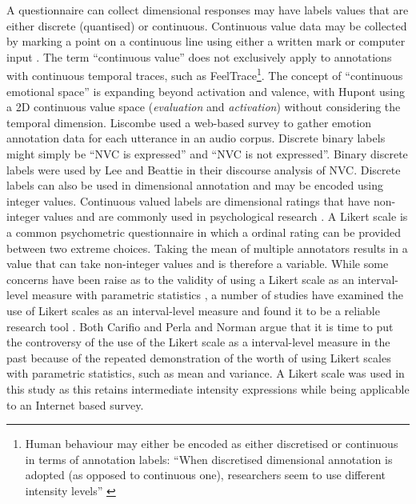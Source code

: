 A questionnaire can collect dimensional responses may have labels values that are either discrete (quantised) or continuous. Continuous value data may be collected by marking a point on a continuous line using either a written mark or computer input \cite{Treiblmaier2011}. The term ``continuous value'' does not exclusively apply to annotations with continuous temporal traces, such as FeelTrace\footnote{Human behaviour may either be encoded as either discretised or continuous in terms of annotation labels: ``When discretised dimensional annotation is adopted (as opposed to continuous one), researchers seem to use different intensity levels'' \cite{Gunes2011}}. The concept of ``continuous emotional space'' is expanding beyond activation and valence, with Hupont \etal \cite{Hupont2013} using a 2{D} continuous value space (\textit{evaluation} and \textit{activation}) without considering the temporal dimension. Liscombe \etal \cite{Liscombe2003} used a web-based survey to gather \continuous emotion annotation data for each utterance in an audio corpus. Discrete binary labels might simply be ``\ac{NVC} is expressed'' and ``\ac{NVC} is not expressed''. Binary discrete labels were used by Lee and Beattie \cite{Lee1998} in their discourse analysis of \ac{NVC}. Discrete labels can also be used in dimensional annotation and may be encoded using integer values. Continuous valued labels are dimensional ratings that have non-integer values and are commonly used in psychological research \cite{Nicolaou2011, Wollmer2009, Cowie2000}. A Likert scale \cite{Likert1932} is a common psychometric questionnaire in which a ordinal rating can be provided between two extreme choices. Taking the mean of multiple annotators results in a value that can take non-integer values and is therefore a \continuous variable. While some concerns have been raise as to the validity of using a Likert scale as an interval-level measure with parametric statistics \cite{Jamieson2004}, a number of studies have examined the use of Likert scales as an interval-level measure and found it to be a reliable research tool \cite{Rasmussen1989} \cite{Owuor2001}. Both Carifio and Perla \cite{Carifio2007} and Norman \cite{Norman2010} argue that it is time to put the controversy of the use of the Likert scale as a interval-level measure in the past because of the repeated demonstration of the worth of using Likert scales with parametric statistics, such as mean and variance.
A Likert scale was used in this study as this retains intermediate intensity expressions while being applicable to an Internet based survey.

